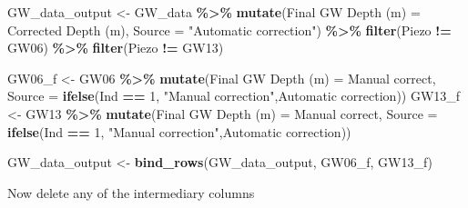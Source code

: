 \documentclass[
]{article}
\newenvironment{Shaded}{\begin{snugshade}}{\end{snugshade}}
\newcommand{\AttributeTok}[1]{\textcolor[rgb]{0.13,0.29,0.53}{#1}}
\newcommand{\DecValTok}[1]{\textcolor[rgb]{0.00,0.00,0.81}{#1}}
\newcommand{\FunctionTok}[1]{\textcolor[rgb]{0.13,0.29,0.53}{\textbf{#1}}}
\newcommand{\NormalTok}[1]{#1}
\newcommand{\OtherTok}[1]{\textcolor[rgb]{0.56,0.35,0.01}{#1}}
\newcommand{\SpecialCharTok}[1]{\textcolor[rgb]{0.81,0.36,0.00}{\textbf{#1}}}
\newcommand{\StringTok}[1]{\textcolor[rgb]{0.31,0.60,0.02}{#1}}
\begin{document}
\begin{Shaded}
\begin{Highlighting}[]
\NormalTok{GW\_data\_output }\OtherTok{\textless{}{-}}\NormalTok{ GW\_data }\SpecialCharTok{\%\textgreater{}\%}
  \FunctionTok{mutate}\NormalTok{(}\StringTok{\textasciigrave{}}\AttributeTok{Final GW Depth (m)}\StringTok{\textasciigrave{}} \OtherTok{=} \StringTok{\textasciigrave{}}\AttributeTok{Corrected Depth (m)}\StringTok{\textasciigrave{}}\NormalTok{,}
         \AttributeTok{Source =} \StringTok{"Automatic correction"}\NormalTok{) }\SpecialCharTok{\%\textgreater{}\%}
  \FunctionTok{filter}\NormalTok{(Piezo }\SpecialCharTok{!=} \StringTok{\textquotesingle{}GW06\textquotesingle{}}\NormalTok{) }\SpecialCharTok{\%\textgreater{}\%}
  \FunctionTok{filter}\NormalTok{(Piezo }\SpecialCharTok{!=} \StringTok{\textquotesingle{}GW13\textquotesingle{}}\NormalTok{)}

\NormalTok{GW06\_f }\OtherTok{\textless{}{-}}\NormalTok{ GW06 }\SpecialCharTok{\%\textgreater{}\%}
  \FunctionTok{mutate}\NormalTok{(}\StringTok{\textasciigrave{}}\AttributeTok{Final GW Depth (m)}\StringTok{\textasciigrave{}} \OtherTok{=} \StringTok{\textasciigrave{}}\AttributeTok{Manual correct}\StringTok{\textasciigrave{}}\NormalTok{,}
         \AttributeTok{Source =} \FunctionTok{ifelse}\NormalTok{(Ind }\SpecialCharTok{==} \DecValTok{1}\NormalTok{,}
                         \StringTok{"Manual correction"}\NormalTok{,}\StringTok{\textquotesingle{}Automatic correction\textquotesingle{}}\NormalTok{)) }
\NormalTok{GW13\_f }\OtherTok{\textless{}{-}}\NormalTok{ GW13 }\SpecialCharTok{\%\textgreater{}\%}
  \FunctionTok{mutate}\NormalTok{(}\StringTok{\textasciigrave{}}\AttributeTok{Final GW Depth (m)}\StringTok{\textasciigrave{}} \OtherTok{=} \StringTok{\textasciigrave{}}\AttributeTok{Manual correct}\StringTok{\textasciigrave{}}\NormalTok{,}
         \AttributeTok{Source =} \FunctionTok{ifelse}\NormalTok{(Ind }\SpecialCharTok{==} \DecValTok{1}\NormalTok{,}
                         \StringTok{"Manual correction"}\NormalTok{,}\StringTok{\textquotesingle{}Automatic correction\textquotesingle{}}\NormalTok{)) }
         
\NormalTok{GW\_data\_output }\OtherTok{\textless{}{-}} \FunctionTok{bind\_rows}\NormalTok{(GW\_data\_output, GW06\_f, GW13\_f)  }
\end{Highlighting}
\end{Shaded}

Now delete any of the intermediary columns
\end{document}
